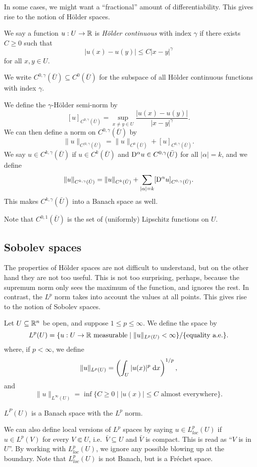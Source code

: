 \documentclass[a4paper]{article}
\begin{document}
In some cases, we might want a ``fractional'' amount of differentiability. This gives rise to the notion of H\"older spaces.
\begin{defi}
  We say a function $u: U \to \mathbb{R}$ is \emph{H\"older continuous} with index $\gamma$ if there exists $C \geq 0$ such that
  \[
    |u(x) - u(y)| \leq C|x - y|^\gamma
  \]
  for all $x, y \in U$.

  We write $C^{0, \gamma}(\bar{U}) \subseteq C^0(\bar{U})$ for the subspace of all H\"older continuous functions with index $\gamma$.

  We define the $\gamma$-H\"older semi-norm by
  \[
    [u]_{C^{0, \gamma}(\bar{U})} = \sup_{x\not= y \in U} \frac{|u(x) - u(y)|}{|x - y|^\gamma}.
  \]
  We can then define a norm on $C^{0, \gamma}(\bar{U})$ by
  \[
    \|u\|_{C^{(0, \gamma}(\bar{U})} = \|u\|_{C^0(\bar{U})} + [u]_{C^{0, \gamma}(\bar{U})}.
  \]
  We say $u \in C^{k, \gamma}(\bar{U})$ if $u \in C^k(\bar{U})$ and $\mathrm{D}^\alpha u \in C^{0, \gamma}(\bar{U})$ for all $|\alpha| = k$, and we define
  \[
    \|u\|_{C^{k, \gamma}(\bar{U})} = \|u\|_{C^k(\bar{U})} + \sum_{|\alpha| = k} [\mathrm{D}^\alpha u]_{C^{0, \gamma}(\bar{U})}.
  \]
  This makes $C^{k, \gamma}(\bar{U})$ into a Banach space as well.
\end{defi}

Note that $C^{0, 1}(\bar{U})$ is the set of (uniformly) Lipschitz functions on $U$.

\subsection{Sobolev spaces}
The properties of H\"older spaces are not difficult to understand, but on the other hand they are not too useful. This is not too surprising, perhaps, because the supremum norm only sees the maximum of the function, and ignores the rest. In contrast, the $L^p$ norm takes into account the values at all points. This gives rise to the notion of Sobolev spaces.

\begin{defi}[$L^p$ space]
  Let $U \subseteq \mathbb{R}^n$ be open, and suppose $1 \leq p \leq \infty$. We define the space  by
  \[
    L^p(U) = \{u: U \to \mathbb{R}\text{ measurable} \mid \|u\|_{L^p(U)} < \infty\}/\{\text{equality a.e.}\}.
  \]
  where, if $p < \infty$, we define
  \[
    \|u\|_{L^p(U)} = \left(\int_U |u(x)|^p\;\mathrm{d} x\right)^{1/p},
  \]
  and
  \[
    \|u\|_{L^\infty(U)} = \inf \{C \geq 0 \mid |u(x)| \leq C\text{ almost everywhere}\}.
  \]
\end{defi}
\begin{thm}
  $L^P(U)$ is a Banach space with the $L^p$ norm.\fakeqed
\end{thm}
We can also define local versions of $L^p$ spaces by saying $u \in L^p_{loc}(U)$ if $u \in L^p(V)$ for every $V \Subset U$, i.e.\ $\bar{V} \subseteq U$ and $\bar{V}$ is compact. This is read as ``$V$ is  in $U$''. By working with $L^p_{loc}(U)$, we ignore any possible blowing up at the boundary. Note that $L^p_{loc}(U)$ is not Banach, but is a Fr\'echet space.
\end{document}
